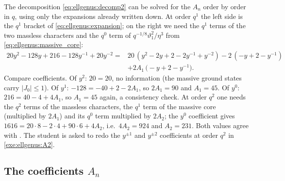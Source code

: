 The decomposition \eqref{eq:ellgenus:decomp2} can be solved for the $A_n$ order by order
in $q$, using only the expansions already written down. At order $q^1$ the left side is the
$q^1$ bracket of \eqref{eq:ellgenus:expansion}; on the right we need the $q^1$ terms of the
two massless characters and the $q^0$ term of $q^{-1/8}\vartheta_1^2/\eta^3$ from
\eqref{eq:ellgenus:massive_core}:
\begin{align*}
 20y^2-128y+216-128y^{-1}+20y^{-2}
 ={}&20\,(y^2-2y+2-2y^{-1}+y^{-2})-2\,(-y+2-y^{-1})\\
 &+2A_1\,\big(-y+2-y^{-1}\big).
\end{align*}
Compare coefficients. Of $y^2$: $20=20$, no information (the massive ground states carry
$|J_0|\le1$). Of $y^1$: $-128=-40+2-2A_1$, so $2A_1=90$ and $A_1=45$. Of $y^0$:
$216=40-4+4A_1$, so $A_1=45$ again, a consistency check. At order $q^2$ one needs the $q^2$
terms of the massless characters, the $q^1$ term of the massive core (multiplied by $2A_1$)
and its $q^0$ term multiplied by $2A_2$; the $y^0$ coefficient gives
$1616=20\cdot8-2\cdot4+90\cdot6+4A_2$, i.e.\ $4A_2=924$ and $A_2=231$. Both values agree with
. The student is asked to redo the $y^{\pm1}$ and
$y^{\pm2}$ coefficients at order $q^2$ in \cref{exe:ellgenus:A2}.

\subsection{The coefficients \texorpdfstring{$A_n$}{An}}\label{sec:ellgenus:An}

